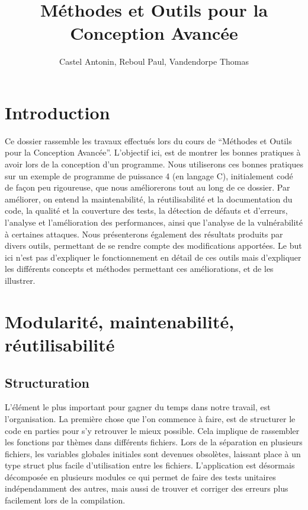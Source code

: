 \documentclass{report}
\title{Méthodes et Outils pour la Conception Avancée}
\author{Castel Antonin, Reboul Paul, Vandendorpe Thomas}
\begin{document}
\maketitle{}
\tableofcontents

\chapter{Introduction}

Ce dossier rassemble les travaux effectués lors du cours de ``Méthodes et Outils pour la Conception Avancée''. L'objectif ici, est de montrer les bonnes pratiques à avoir lors de la conception d'un programme. Nous utiliserons ces bonnes pratiques sur un exemple de programme de puissance 4 (en langage C), initialement codé de façon peu rigoureuse, que nous améliorerons tout au long de ce dossier. Par améliorer, on entend  la maintenabilité, la réutilisabilité et la documentation du code, la qualité et la couverture des tests, la détection de défauts et d'erreurs, l'analyse et l'amélioration des performances, ainsi que l'analyse de la vulnérabilité à certaines attaques. Nous présenterons également des résultats produits par divers outils, permettant de se rendre compte des modifications apportées. Le but ici n'est pas d'expliquer le fonctionnement en détail de ces outils mais d'expliquer les différents concepts et méthodes permettant ces améliorations, et de les illustrer.

\chapter{Modularité, maintenabilité, réutilisabilité}
\section{Structuration}
L'élément le plus important pour gagner du temps dans notre travail, est l'organisation. La première chose que l'on commence à faire, est de structurer le code en parties pour s'y retrouver le mieux possible. Cela implique de rassembler les fonctions par thèmes dans différents fichiers. Lors de la séparation en plusieurs fichiers, les variables globales initiales sont devenues obsolètes, laissant place à un type struct plus facile d'utilisation entre les fichiers. L'application est désormais décomposée en plusieurs modules ce qui permet de faire des tests unitaires indépendamment des autres, mais aussi de trouver et corriger des erreurs plus facilement lors de la compilation.
\end{document}
